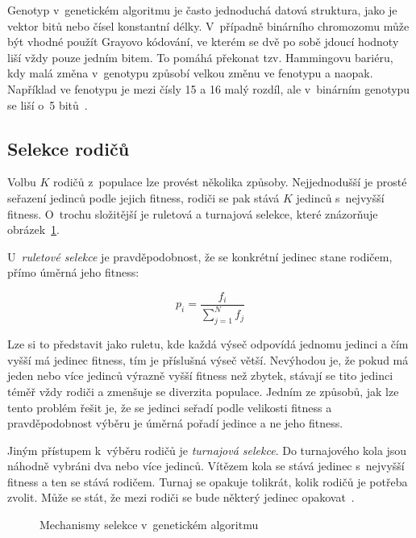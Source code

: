 Genotyp v~genetickém algoritmu je často jednoduchá datová struktura, jako je vektor bitů nebo čísel konstantní délky. V~případně binárního chromozomu může být vhodné použít Grayovo kódování, ve kterém se dvě po sobě jdoucí hodnoty liší vždy pouze jedním bitem. To pomáhá překonat tzv. Hammingovu bariéru, kdy malá změna v~genotypu způsobí velkou změnu ve fenotypu a naopak. Například ve fenotypu je mezi čísly 15 a 16 malý rozdíl, ale v~binárním genotypu se liší o~5 bitů~\cite{HandbookGA}.


\subsection{Selekce rodičů}

Volbu $K$ rodičů z~populace lze provést několika způsoby. Nejjednodušší je prosté seřazení jedinců podle jejich fitness, rodiči se pak stává $K$ jedinců s~nejvyšší fitness. O~trochu složitější je ruletová a turnajová selekce, které znázorňuje obrázek~\ref{obrSelekce}.

U~\emph{ruletové selekce} je pravděpodobnost, že se konkrétní jedinec stane rodičem, přímo úměrná jeho fitness:

\begin{equation}
p_i = \frac{f_i}{\sum_{j=1}^N{f_j}}
\end{equation}

\noindent{}Lze si to představit jako ruletu, kde každá výseč odpovídá jednomu jedinci a čím vyšší má jedinec fitness, tím je příslušná výseč větší. Nevýhodou je, že pokud má jeden nebo více jedinců výrazně vyšší fitness než zbytek, stávají se tito jedinci téměř vždy rodiči a zmenšuje se diverzita populace. Jedním ze způsobů, jak lze tento problém řešit je, že se jedinci seřadí podle velikosti fitness a pravděpodobnost výběru je úměrná pořadí jedince a ne jeho fitness.

Jiným přístupem k~výběru rodičů je \emph{turnajová selekce}. Do turnajového kola jsou náhodně vybráni dva nebo více jedinců. Vítězem kola se stává jedinec s~nejvyšší fitness a ten se stává rodičem. Turnaj se opakuje tolikrát, kolik rodičů je potřeba zvolit. Může se stát, že mezi rodiči se bude některý jedinec opakovat~\cite{Modra}.


\begin{figure}[hbt]
    \centering
    \hfill
    \hfill
    \caption{Mechanismy selekce v~genetickém algoritmu}
    \label{obrSelekce}
\end{figure}



